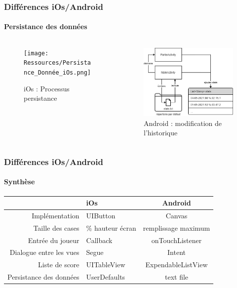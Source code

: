 \documentclass{beamer}
\begin{document}
\begin{frame}[fragile]
  \frametitle{Différences iOs/Android}
    \framesubtitle{Persistance des données}

    \begin{columns}
    \tiny
        \begin{column}{0.5\linewidth}
        \begin{figure}[H]
            \centering
            \texttt{[image: Ressources/Persistance\_Donnée\_iOs.png]}
            \caption{iOs : Processus persistance}
        \end{figure}
        \end{column}
        
        \begin{column}{0.5\linewidth}
            \begin{figure}[H]
            \centering
            \includegraphics[width=1\linewidth]{Ressources/dataAndroid.png}
            \caption{Android : modification de l'historique}
        \end{figure}
        \end{column}
    \end{columns}
\end{frame}

\begin{frame}
  \frametitle{Différences iOs/Android}
  \framesubtitle{Synthèse}
  \begin{tabular}{|r|l|c|}
  \hline
      & iOs & Android\\
  \hline
      Implémentation & UIButton & Canvas \\
      Taille des cases  &  \% hauteur écran & remplissage maximum  \\
      Entrée du joueur  & Callback & onTouchListener  \\
      Dialogue entre les vues  & Segue & Intent  \\
      Liste de score  & UITableView & ExpendableListView  \\
      Persistance des données  & UserDefaults & text file  \\
  \hline
\end{tabular}

  
\end{frame}
\end{document}
